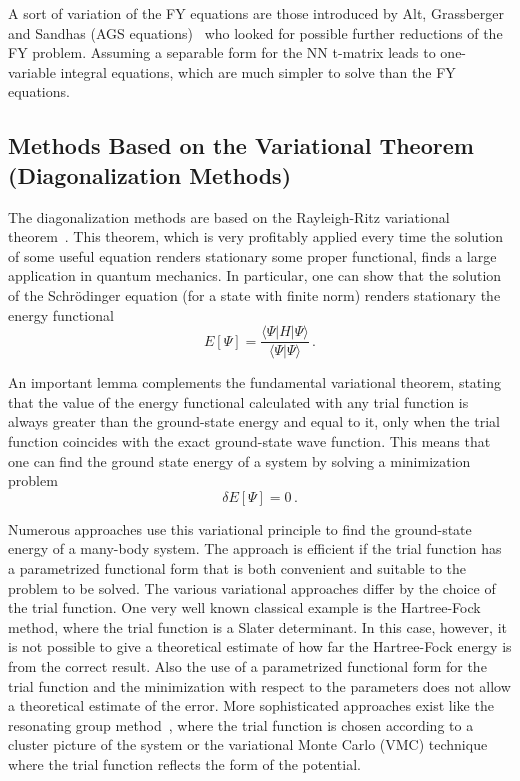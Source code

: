 A sort of variation of the FY equations are those introduced by Alt, Grassberger
and Sandhas (AGS equations)~\cite{AGS} who looked for possible further reductions of the FY problem. 
Assuming a separable form for the NN t-matrix leads to one-variable integral equations, which are much simpler 
to solve than the FY equations.

\subsection{Methods Based on the Variational Theorem (Diagonalization Methods)}\label{sec:VAR}
The diagonalization methods  are based on the Rayleigh-Ritz variational theorem~\cite{Ra870,Ri909}.
This theorem, which is very profitably applied every time  the solution of some useful equation renders stationary
some proper functional, finds a large application in quantum mechanics. In particular, one can show that the solution of the
Schr\"odinger equation (for a  state with finite norm) renders stationary  the energy
functional
\begin{equation}
 E[\Psi]=\frac{\langle\Psi|H|\Psi\rangle}{\langle\Psi|\Psi\rangle}\,.
\end{equation}

An important  lemma complements the fundamental variational theorem, stating that the value of the energy functional 
calculated with any trial function is always greater than the ground-state energy and equal to it, only when the trial function 
coincides with the exact ground-state wave function.
This means that one can find the ground state energy of a system by solving a minimization problem  
 \begin{equation}
 \delta E[\Psi]=0\,.\label{vareq}
\end{equation}

Numerous approaches use this variational principle to find the ground-state energy of a many-body system.
The approach is efficient if the trial function has a parametrized functional form that is both convenient 
and suitable to the problem to be solved. The various variational approaches differ by the choice of the trial function.
One very well known classical example is the Hartree-Fock method, where the trial function is a Slater determinant. 
In this case, however, it is not possible to give a theoretical estimate of how far the Hartree-Fock energy is from the correct result. 
Also the use of a parametrized functional form for the trial function and the minimization with respect to the parameters 
does not allow a theoretical  estimate of the error. More sophisticated approaches exist like the resonating group method~\cite{RGM1,RGM2}, 
where the trial function 
is chosen according to a cluster picture of the system  or the variational Monte Carlo (VMC) technique where the trial function reflects 
the form of the potential.

